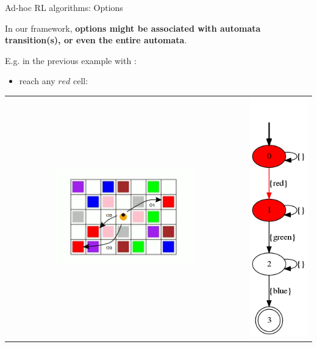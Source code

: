 \documentclass{beamer}
\begin{document}
\begin{frame}{Ad-hoc RL algorithms: Options}
	
	In our framework, \textbf{options might be associated with automata transition(s), or even the entire automata}.
	
	E.g. in the previous example with \Sapientino:
	\begin{itemize}
		\item reach any $red$ cell:
	\end{itemize}
	\begin{table}
		
		\begin{tabular}{c c}
			\includegraphics[width=0.6\textwidth]{images/sapientino-option-red}
			&
			\includegraphics[height=0.6\textheight]{images/sapientino-simple-dfa-red-arrow}
		\end{tabular}
		
	\end{table}
	
\end{frame}
\end{document}
